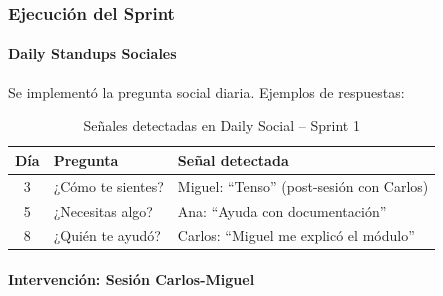 \subsubsection{Ejecución del Sprint}

\paragraph{Daily Standups Sociales}

Se implementó la pregunta social diaria. Ejemplos de respuestas:

\begin{table}[h]
    \centering
    \small
    \begin{tabularx}{\textwidth}{|c|l|X|}
        \hline
        \textbf{Día} & \textbf{Pregunta}                        & \textbf{Señal detectada} \\
        \hline
        3
                     & ¿Cómo te sientes?
                     & Miguel: “Tenso” (post-sesión con Carlos)                            \\
        \hline
        5
                     & ¿Necesitas algo?
                     & Ana: “Ayuda con documentación”                                      \\
        \hline
        8
                     & ¿Quién te ayudó?
                     & Carlos: “Miguel me explicó el módulo”                               \\
        \hline
    \end{tabularx}
    \caption{Señales detectadas en Daily Social – Sprint 1}
    \label{tab:daily-sprint1}
\end{table}
\FloatBarrier

\paragraph{Intervención: Sesión Carlos-Miguel}\mbox{}\\[-0.3\baselineskip]

